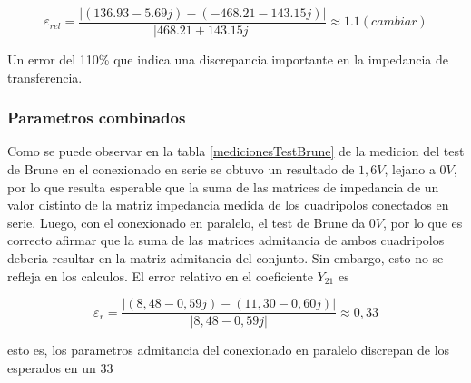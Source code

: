 




















\[
\varepsilon_{rel} = \frac{|(136.93 - 5.69j) - (-468.21 - 143.15j)|}{|468.21 + 143.15j|} \approx 1.1 (cambiar)
\]



Un error del 110\% que indica una discrepancia importante en la impedancia de transferencia.

\subsubsection{Parametros combinados}
Como se puede observar en la tabla \ref{medicionesTestBrune} de la medicion del test de Brune en el conexionado en serie se obtuvo un resultado de $1,6 V$, lejano a $0 V$, por lo que resulta esperable que la suma de las matrices de impedancia de un valor distinto de la matriz impedancia medida de los cuadripolos conectados en serie. Luego, con el conexionado en paralelo, el test de Brune da $0 V$, por lo que es correcto afirmar que la suma de las matrices admitancia de ambos cuadripolos deberia resultar en la matriz admitancia del conjunto. Sin embargo, esto no se refleja en los calculos. El error relativo en el coeficiente $Y_{21}$ es

\begin{equation*}
    \varepsilon_r = \frac{\left| (8,48 - 0,59j) - (11,30 - 0,60j) \right|} {\left| 8,48 - 0,59j \right|} \approx 0,33
\end{equation*}

esto es, los parametros admitancia del conexionado en paralelo discrepan de los esperados en un 33%
